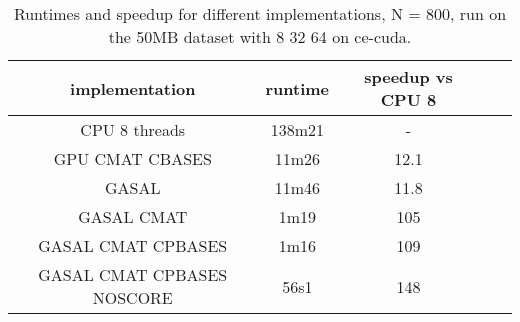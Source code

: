 \documentclass[../main/thesis.tex]{subfiles}
\begin{document}
\begin{table}
\centering
\caption{Runtimes and speedup for different implementations, N = 800, run on the 50MB dataset with 8 32 64 on ce-cuda.}
\label{tbl:darwin3}
\begin{tabular}{c c c c c}
implementation & runtime & speedup vs CPU 8 \\ \hline
CPU 8 threads & 138m21 & - \\
GPU CMAT CBASES & 11m26 & 12.1 \\
GASAL & 11m46 & 11.8 \\
GASAL CMAT & 1m19 & 105 \\
GASAL CMAT CPBASES & 1m16 & 109 \\
GASAL CMAT CPBASES NOSCORE & 56s1 & 148 \\
\end{tabular}
\end{table}





\end{document}
